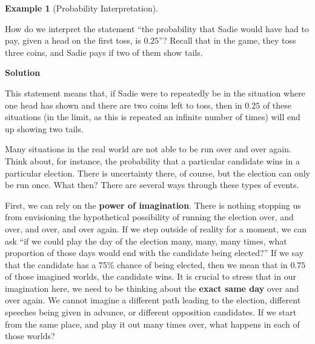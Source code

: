 \documentclass[
  letterpaper,
  DIV=11,
  numbers=noendperiod]{scrreprt}
\theoremstyle{definition}
\theoremstyle{definition}
\theoremstyle{definition}
\newtheorem{example}{Example}[chapter]
\theoremstyle{remark}
\begin{document}
\begin{example}[Probability
Interpretation]\protect\hypertarget{exm-prob-interp}{}\label{exm-prob-interp}

How do we interpret the statement ``the probability that Sadie would
have had to pay, given a head on the first toss, is \(0.25\)''? Recall
that in the game, they toss three coins, and Sadie pays if two of them
show tails.

\begin{tcolorbox}[enhanced jigsaw, colback=white, breakable, rightrule=.15mm, leftrule=.75mm, toprule=.15mm, left=2mm, arc=.35mm, opacityback=0, bottomrule=.15mm]

\vspace{-3mm}\textbf{Solution}\vspace{3mm}

This statement means that, if Sadie were to repeatedly be in the
situation where one head has shown and there are two coins left to toss,
then in \(0.25\) of these situations (in the limit, as this is repeated
an infinite number of times) will end up showing two tails.

\end{tcolorbox}

\end{example}

Many situations in the real world are not able to be run over and over
again. Think about, for instance, the probability that a particular
candidate wins in a particular election. There is uncertainty there, of
course, but the election can only be run once. What then? There are
several ways through these types of events.

First, we can rely on the \textbf{power of imagination}. There is
nothing stopping us from envisioning the hypothetical possibility of
running the election over, and over, and over, and over again. If we
step outside of reality for a moment, we can ask ``if we could play the
day of the election many, many, many times, what proportion of those
days would end with the candidate being elected?'' If we say that the
candidate has a 75\% chance of being elected, then we mean that in
\(0.75\) of those imagined worlds, the candidate wins. It is crucial to
stress that in our imagination here, we need to be thinking about the
\textbf{exact same day} over and over again. We cannot imagine a
different path leading to the election, different speeches being given
in advance, or different opposition candidates. If we start from the
same place, and play it out many times over, what happens in each of
those worlds?
\end{document}
